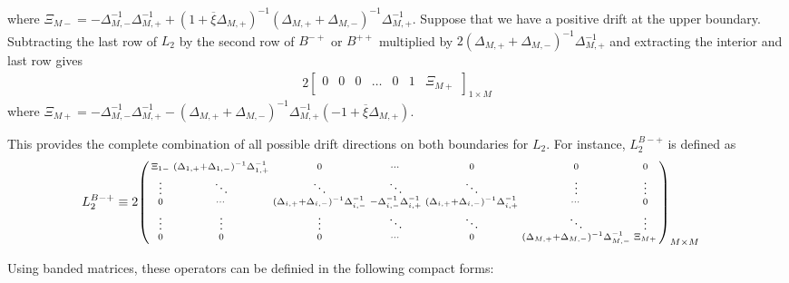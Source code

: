 \documentclass[11pt]{article}
\newenvironment{psmallmatrix}
{\left(\begin{smallmatrix}}
	{\end{smallmatrix}\right)}
\theoremstyle{definition}
\begin{document}
where $\Xi_{M-} = -\Delta_{M,-}^{-1} \Delta_{M,+}^{-1} + (1 + \overline{\xi} \Delta_{M,+})^{-1} (\Delta_{M,+} + \Delta_{M,-})^{-1}  \Delta_{M,+}^{-1}$. Suppose that we have a positive drift at the upper boundary. Subtracting the last row of $L_2$ by the second row of $B^{-+}$ or $B^{++}$ multiplied by $2(\Delta_{M,+} + \Delta_{M,-})^{-1} \Delta_{M,+}^{-1} $ and extracting the interior and last row gives
\begin{align}
2\begin{bmatrix}
0 &0&0&\dots&0&1&\Xi_{M+}
\end{bmatrix}_{1\times M}
\end{align}
where $\Xi_{M+} = -\Delta_{M,-}^{-1} \Delta_{M,+}^{-1} - ( \Delta_{M,+} + \Delta_{M,-} )^{-1} \Delta_{M,+}^{-1} (-1 + \overline{\xi} \Delta_{M,+})  $.

This provides the complete combination of all possible drift directions on both boundaries for $L_2$. For instance, $L_2^{B-+}$ is defined as
\begin{align}
L_2^{B-+} &\equiv  2 \begin{psmallmatrix}
\Xi_{1-} &
(\Delta_{1,+}+\Delta_{1,-})^{-1} \Delta_{1,+}^{-1}
&0&\cdots&0&0&0 \\
\vdots&\ddots&\ddots&\ddots&\ddots&\vdots&\vdots\\
0&\cdots&
(\Delta_{i,+}+\Delta_{i,-})^{-1} \Delta_{i,-}^{-1} &
-\Delta_{i,-}^{-1} \Delta_{i,+}^{-1}  &
(\Delta_{i,+}+\Delta_{i,-})^{-1} \Delta_{i,+}^{-1}&\cdots&0 \\
\vdots&\vdots&\vdots&\ddots&\ddots&\ddots&\vdots\\
0&0&0&\cdots&0&(\Delta_{M,+}+\Delta_{M,-})^{-1} \Delta_{M,-}^{-1}&\Xi_{M+}
\end{psmallmatrix}_{M\times M}
\end{align}



Using banded matrices, these operators can be definied in the following compact forms:
\end{document}
